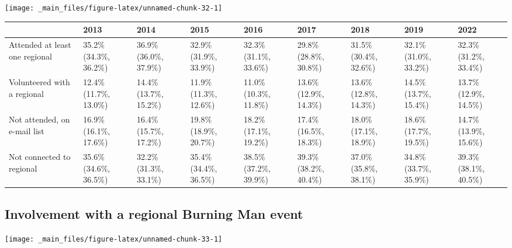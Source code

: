 \documentclass[
]{book}
\begin{document}
\texttt{[image: \_main\_files/figure-latex/unnamed-chunk-32-1]}

\begin{table}
\centering
\begin{tabular}[t]{>{}l|>{}l|>{}l|>{}l|>{}l|>{}l|>{}l|>{}l|>{}l}
\hline
  & 2013 & 2014 & 2015 & 2016 & 2017 & 2018 & 2019 & 2022\\
\hline
Attended at least 
 one regional & 35.2\% (34.3\%, 36.2\%) & 36.9\% (36.0\%, 37.9\%) & 32.9\% (31.9\%, 33.9\%) & 32.3\% (31.1\%, 33.6\%) & 29.8\% (28.8\%, 30.8\%) & 31.5\% (30.4\%, 32.6\%) & 32.1\% (31.0\%, 33.2\%) & 32.3\% (31.2\%, 33.4\%)\\
\hline
Volunteered with 
 a regional & 12.4\% (11.7\%, 13.0\%) & 14.4\% (13.7\%, 15.2\%) & 11.9\% (11.3\%, 12.6\%) & 11.0\% (10.3\%, 11.8\%) & 13.6\% (12.9\%, 14.3\%) & 13.6\% (12.8\%, 14.3\%) & 14.5\% (13.7\%, 15.4\%) & 13.7\% (12.9\%, 14.5\%)\\
\hline
Not attended, 
 on e-mail list & 16.9\% (16.1\%, 17.6\%) & 16.4\% (15.7\%, 17.2\%) & 19.8\% (18.9\%, 20.7\%) & 18.2\% (17.1\%, 19.2\%) & 17.4\% (16.5\%, 18.3\%) & 18.0\% (17.1\%, 18.9\%) & 18.6\% (17.7\%, 19.5\%) & 14.7\% (13.9\%, 15.6\%)\\
\hline
Not connected 
 to regional & 35.6\% (34.6\%, 36.5\%) & 32.2\% (31.3\%, 33.1\%) & 35.4\% (34.4\%, 36.5\%) & 38.5\% (37.2\%, 39.9\%) & 39.3\% (38.2\%, 40.4\%) & 37.0\% (35.8\%, 38.1\%) & 34.8\% (33.7\%, 35.9\%) & 39.3\% (38.1\%, 40.5\%)\\
\hline
\end{tabular}
\end{table}

\hypertarget{involvement-with-a-regional-burning-man-event}{%
\subsection{Involvement with a regional Burning Man event}\label{involvement-with-a-regional-burning-man-event}}

\texttt{[image: \_main\_files/figure-latex/unnamed-chunk-33-1]}
\end{document}

